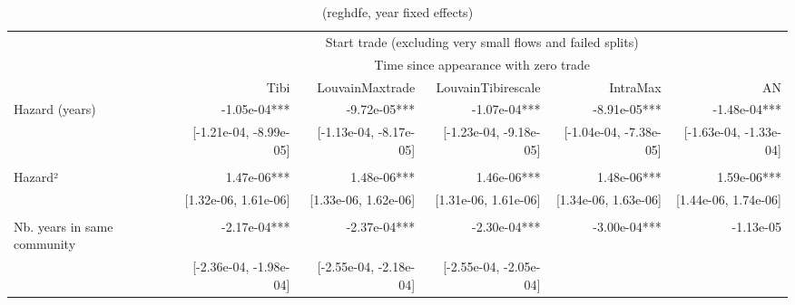 \begin{table}[!h]
\caption{(reghdfe, year fixed effects)}
\centering
\begin{tabular}{llllll}
\cline{1-6}
\multicolumn{1}{c}{} &
  \multicolumn{5}{|c}{Start trade (excluding very small flows and failed splits)} \\
\multicolumn{1}{c}{} &
  \multicolumn{5}{|c}{Time since appearance with zero trade} \\
\multicolumn{1}{c}{} &
  \multicolumn{1}{|r}{Tibi} &
  \multicolumn{1}{r}{LouvainMaxtrade} &
  \multicolumn{1}{r}{LouvainTibirescale} &
  \multicolumn{1}{r}{IntraMax} &
  \multicolumn{1}{r}{AN} \\
\cline{1-6}
\multicolumn{1}{l}{Hazard (years)} &
  \multicolumn{1}{|r}{-1.05e-04***} &
  \multicolumn{1}{r}{-9.72e-05***} &
  \multicolumn{1}{r}{-1.07e-04***} &
  \multicolumn{1}{r}{-8.91e-05***} &
  \multicolumn{1}{r}{-1.48e-04***} \\
\multicolumn{1}{l}{} &
  \multicolumn{1}{|r}{[-1.21e-04, -8.99e-05]} &
  \multicolumn{1}{r}{[-1.13e-04, -8.17e-05]} &
  \multicolumn{1}{r}{[-1.23e-04, -9.18e-05]} &
  \multicolumn{1}{r}{[-1.04e-04, -7.38e-05]} &
  \multicolumn{1}{r}{[-1.63e-04, -1.33e-04]} \\
\multicolumn{1}{l}{} &
  \multicolumn{1}{|r}{} &
  \multicolumn{1}{r}{} &
  \multicolumn{1}{r}{} &
  \multicolumn{1}{r}{} &
  \multicolumn{1}{r}{} \\
\multicolumn{1}{l}{Hazard²} &
  \multicolumn{1}{|r}{1.47e-06***} &
  \multicolumn{1}{r}{1.48e-06***} &
  \multicolumn{1}{r}{1.46e-06***} &
  \multicolumn{1}{r}{1.48e-06***} &
  \multicolumn{1}{r}{1.59e-06***} \\
\multicolumn{1}{l}{} &
  \multicolumn{1}{|r}{[1.32e-06,  1.61e-06]} &
  \multicolumn{1}{r}{[1.33e-06,  1.62e-06]} &
  \multicolumn{1}{r}{[1.31e-06,  1.61e-06]} &
  \multicolumn{1}{r}{[1.34e-06,  1.63e-06]} &
  \multicolumn{1}{r}{[1.44e-06,  1.74e-06]} \\
\multicolumn{1}{l}{} &
  \multicolumn{1}{|r}{} &
  \multicolumn{1}{r}{} &
  \multicolumn{1}{r}{} &
  \multicolumn{1}{r}{} &
  \multicolumn{1}{r}{} \\
\multicolumn{1}{l}{Nb. years in same community} &
  \multicolumn{1}{|r}{-2.17e-04***} &
  \multicolumn{1}{r}{-2.37e-04***} &
  \multicolumn{1}{r}{-2.30e-04***} &
  \multicolumn{1}{r}{-3.00e-04***} &
  \multicolumn{1}{r}{-1.13e-05} \\
\multicolumn{1}{l}{} &
  \multicolumn{1}{|r}{[-2.36e-04, -1.98e-04]} &
  \multicolumn{1}{r}{[-2.55e-04, -2.18e-04]} &
  \multicolumn{1}{r}{[-2.55e-04, -2.05e-04]} &

\end{tabular}
\end{table}
